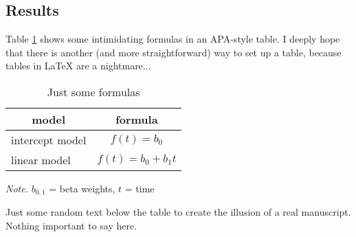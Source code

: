 
 \subsection{Results}

Table \ref{tab:models} shows some intimidating formulas in an APA-style table. I deeply hope that there is another (and more straightforward) way to set up a table, because tables in LaTeX are a nightmare...

\begin{table}[htbp]
  \centering
  \vspace*{2em}
  \begin{threeparttable}
    \caption{Just some formulas}
    \label{tab:models}
    \begin{tabular}{@{}lc@{}}
      \toprule
        \multicolumn{1}{c}{\textbf{model}}  & \multicolumn{1}{c}{\textbf{formula}} \\
      \midrule
        intercept model & \multicolumn{1}{c}{$f(t) = b_{0}$} \\
        linear model &   \multicolumn{1}{c}{$f(t) = b_{0} + b_{1}t$} \\
      \midrule
    \end{tabular}
    \begin{tablenotes}
      {\small\textit{Note.} $b_{0,1}$ = beta weights,  $t$ = time}
    \end{tablenotes}
  \end{threeparttable}
\end{table}

Just some random text below the table to create the illusion of a real manuscript. Nothing important to say here.
